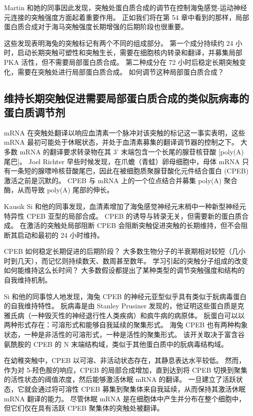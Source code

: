 Martin 和她的同事因此发现，突触处蛋白质合成的调节在控制海兔感觉-运动神经元连接的突触强度方面起着重要作用。 正如我们将在第 54 章中看到的那样，局部蛋白质合成对于海马突触强度长期增强的后期阶段也很重要。

这些发现表明海兔的突触标记有两个不同的组成部分。 第一个成分持续约 24 小时，启动长期突触可塑性和突触生长，需要在细胞核内转录和翻译，并募集局部 PKA 活性，但不需要局部蛋白质合成。 第二种成分在 72 小时后稳定长期突触变化，需要在突触处进行局部蛋白质合成。 如何调节这种局部蛋白质合成？

\subsection{维持长期突触促进需要局部蛋白质合成的类似朊病毒的蛋白质调节剂}
mRNA 在突触处翻译以响应血清素一个脉冲对该突触的标记这一事实表明，这些 mRNA 最初可能处于休眠状态，并处于血清素募集的翻译调节器的控制之下。 大多数 mRNA 的翻译要求转录物在其 3' 末端包含一个长尾的腺苷核苷酸 [poly(A) 尾巴]。 Joel Richter 早些时候发现，在爪蟾（青蛙）卵母细胞中，母体 mRNA 只有一条短的腺嘌呤核苷酸尾巴，因此在被细胞质聚腺苷酸化元件结合蛋白 (CPEB) 激活之前是沉默的。 CPEB 与 mRNA 上的一个位点结合并募集 poly(A) 聚合酶，从而导致 poly(A) 尾部的伸长。

Kausik Si 和他的同事发现，血清素增加了海兔感觉神经元末梢中一种新型神经元特异性 CPEB 亚型的局部合成。 CPEB 的诱导与转录无关，但需要新的蛋白质合成。 在激活的突触处局部阻断 CPEB 会阻断突触促进突触的长期维持，但不会阻断其启动和最初的 24 小时维持。

CPEB 如何稳定长期促进的后期阶段？ 大多数生物分子的半衰期相对较短（几小时到几天），而记忆则持续数天、数周甚至数年。 学习引起的突触分子组成的改变如何能维持这么长时间？ 大多数假设都提出了某种类型的调节突触强度和结构的自我维持机制。

Si 和他的同事惊人地发现，海兔 CPEB 的神经元亚型似乎具有类似于朊病毒蛋白的自我维持特性。 朊病毒是由 Stanley Prusiner 发现的，他证明这些蛋白质是克雅氏病（一种毁灭性的神经退行性人类疾病）和疯牛病的病原体。 朊蛋白可以以两种形式存在：可溶形式和能够自我延续的聚集形式。 海兔 CPEB 也有两种构象状态，一种是非活性的可溶形式，一种是活性的聚集形式。 该开关取决于富含谷氨酰胺的 CPEB 的 N 末端结构域，类似于其他蛋白质中的朊病毒结构域。

在幼稚突触中，CPEB 以可溶、非活动状态存在，其静息表达水平较低。 然而，作为对 5-羟色胺的响应，CPEB 的局部合成增加，直到达到将 CPEB 切换到聚集的活性状态的阈值浓度，然后能够激活休眠 mRNA 的翻译。 一旦建立了活跃状态，它就会通过将可溶性 CPEB 募集到聚集体来自我延续，从而保持其激活休眠 mRNA 翻译的能力。 尽管休眠 mRNA 是在细胞体中产生并分布在整个细胞中，但它们仅在具有活跃 CPEB 聚集体的突触处被翻译。

